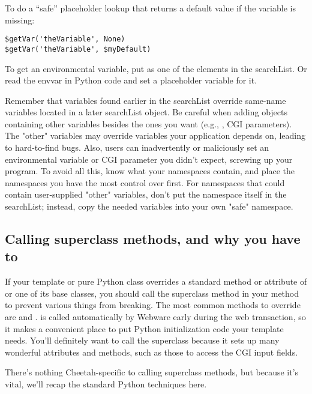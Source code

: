 To do a ``safe'' placeholder lookup that returns a default value if the
variable is missing:
\begin{verbatim}
$getVar('theVariable', None)
$getVar('theVariable', $myDefault)
\end{verbatim}

To get an environmental variable, put  as one of the
elements in the searchList.  Or read the envvar in Python code and set a
placeholder variable for it.

Remember that variables found earlier in the searchList override same-name
variables located in a later searchList object.  Be careful when adding objects
containing other variables besides the ones you want (e.g., ,
CGI parameters).  The "other" variables may override variables your application
depends on, leading to hard-to-find bugs.  Also, users can inadvertently or
maliciously set an environmental variable or CGI parameter you didn't expect,
screwing up your program.  To avoid all this, know what your namespaces
contain, and place the namespaces you have the most control over first.  For
namespaces that could contain user-supplied "other" variables, don't put the
namespace itself in the searchList; instead, copy the needed variables into
your own "safe" namespace.


\subsection{Calling superclass methods, and why you have to}
\label{tips.callingSuperclassMethods}

If your template or pure Python class overrides a standard method or attribute of 
or one of its base classes, you should call the superclass method in your
method to prevent various things from breaking.  The most common methods to
override are  and .   is called
automatically by Webware early during the web transaction, so it makes a 
convenient place to put Python initialization code your template needs.
You'll definitely want to call the superclass  because it sets
up many wonderful attributes and methods, such as those to access the CGI input
fields.  

There's nothing Cheetah-specific to calling superclass methods, but because
it's vital, we'll recap the standard Python techniques here.

